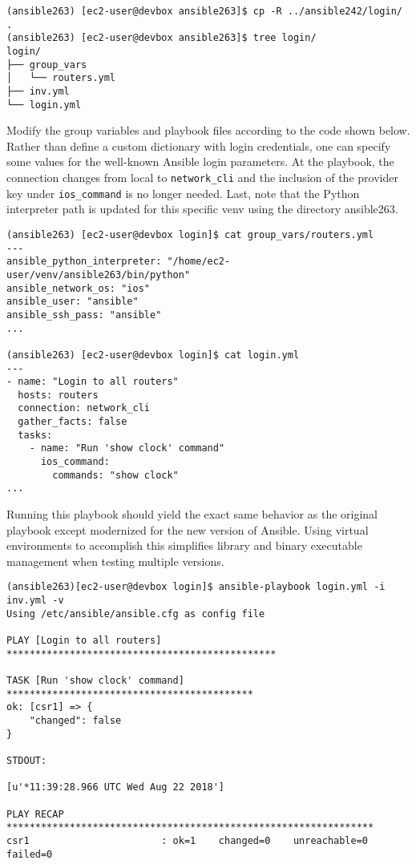 \begin{verbatim}
(ansible263) [ec2-user@devbox ansible263]$ cp -R ../ansible242/login/ .
(ansible263) [ec2-user@devbox ansible263]$ tree login/
login/
├── group_vars
│   └── routers.yml
├── inv.yml
└── login.yml
\end{verbatim}

Modify the group variables and playbook files according to the code shown
below. Rather than define a custom dictionary with login credentials, one can
specify some values for the well-known Ansible login parameters. At the
playbook, the connection changes from local to \verb|network_cli| and the inclusion
of the provider key under \verb|ios_command| is no longer needed. Last, note that the
Python interpreter path is updated for this specific venv using the directory
ansible263.

\begin{verbatim}
(ansible263) [ec2-user@devbox login]$ cat group_vars/routers.yml
---
ansible_python_interpreter: "/home/ec2-user/venv/ansible263/bin/python"
ansible_network_os: "ios"
ansible_user: "ansible"
ansible_ssh_pass: "ansible"
...

(ansible263) [ec2-user@devbox login]$ cat login.yml
---
- name: "Login to all routers"
  hosts: routers
  connection: network_cli
  gather_facts: false
  tasks:
    - name: "Run 'show clock' command"
      ios_command:
        commands: "show clock"
...
\end{verbatim}

Running this playbook should yield the exact same behavior as the original
playbook except modernized for the new version of Ansible. Using virtual
environments to accomplish this simplifies library and binary executable
management when testing multiple versions.

\begin{verbatim}
(ansible263)[ec2-user@devbox login]$ ansible-playbook login.yml -i inv.yml -v
Using /etc/ansible/ansible.cfg as config file

PLAY [Login to all routers] ***********************************************

TASK [Run 'show clock' command] *******************************************
ok: [csr1] => {
    "changed": false
}

STDOUT:

[u'*11:39:28.966 UTC Wed Aug 22 2018']

PLAY RECAP ****************************************************************
csr1                       : ok=1    changed=0    unreachable=0    failed=0
\end{verbatim}
